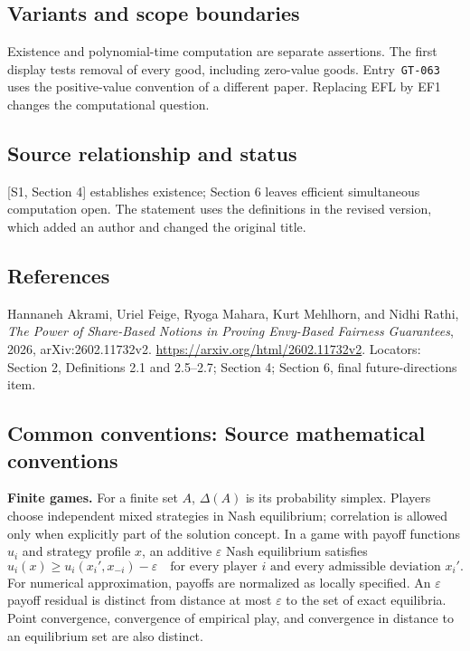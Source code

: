 \documentclass[11pt,a4paper]{article}
\begin{document}
\subsection*{Variants and scope boundaries}
Existence and polynomial-time computation are separate assertions.
The first display tests removal of every good, including zero-value goods.
Entry~\texttt{GT-063} uses the positive-value convention of a different paper.
Replacing EFL by EF1 changes the computational question.

\subsection*{Source relationship and status}
[S1, Section 4] establishes existence; Section 6 leaves efficient
simultaneous computation open. The statement uses the definitions in the
revised version, which added an author and changed the original title.

\subsection*{References}
\begingroup\footnotesize\raggedright
\noindent[S1] Hannaneh Akrami, Uriel Feige, Ryoga Mahara, Kurt Mehlhorn,
and Nidhi Rathi,
\emph{The Power of Share-Based Notions in Proving Envy-Based Fairness
Guarantees}, 2026, arXiv:2602.11732v2.
\url{https://arxiv.org/html/2602.11732v2}.
Locators: Section 2, Definitions 2.1 and 2.5--2.7;
Section 4; Section 6, final future-directions item.
\par\endgroup

\subsection*{Common conventions: Source mathematical conventions}

\textbf{Finite games.} For a finite set $A$, $\Delta(A)$ is its probability
simplex. Players choose independent mixed strategies in Nash equilibrium;
correlation is allowed only when explicitly part of the solution concept.
In a game with payoff functions $u_i$ and strategy profile $x$, an additive
$\varepsilon$ Nash equilibrium satisfies
\[
 u_i(x)\geq u_i(x_i',x_{-i})-\varepsilon
 \quad\text{for every player $i$ and every admissible deviation $x_i'$}.
\]
For numerical approximation, payoffs are normalized as locally specified.
An $\varepsilon$ payoff residual is distinct from distance at most
$\varepsilon$ to the set of exact equilibria. Point convergence, convergence
of empirical play, and convergence in distance to an equilibrium set are
also distinct.
\end{document}
